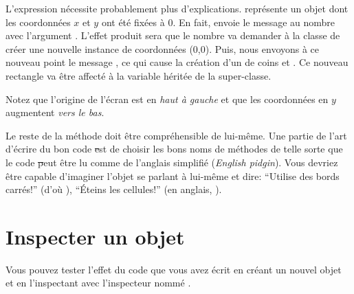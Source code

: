 \documentclass[a4paper,10pt,twoside]{book}
\begin{document}
L'expression  nécessite probablement plus d'explications.
 représente un objet  dont les coordonnées $x$ et $y$ ont été fixées à 0.
En fait,  envoie le message  au
nombre  avec l'argument .
L'effet produit sera que le nombre  va demander à la classe  de créer une nouvelle instance de coordonnées (0,0).
Puis, nous envoyons à ce nouveau point le message , ce qui cause la création d'un  de coins  et .
Ce nouveau rectangle va être affecté à la variable  héritée de la super-classe.

Notez que l'origine de l'écran \pharo est en \emph{haut à gauche} et que les coordonnées en $y$ augmentent \emph{vers le bas}.

Le reste de la méthode doit être compréhensible de lui-même.
Une partie de l'art d'écrire du bon code \st est de choisir les bons
noms de méthodes de telle sorte que le code \st peut être lu comme
de l'anglais simplifié (\emph{English pidgin}).  
Vous devriez être capable d'imaginer l'objet se parlant à lui-même et
dire:  ``Utilise des bords carrés!'' (d'où ),
``Éteins les cellules!'' (en anglais, ).

\section{Inspecter un objet}

Vous pouvez tester l'effet du code que vous avez écrit en créant un
nouvel objet  et en l'inspectant avec l'inspecteur nommé .
\end{document}
